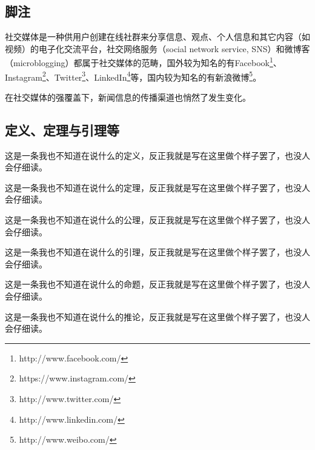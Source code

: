 \documentclass[a4paper,AutoFakeBold,oneside,12pt]{book}
\begin{document}
\subsection{脚注}
社交媒体是一种供用户创建在线社群来分享信息、观点、个人信息和其它内容（如视频）的电子化交流平台，社交网络服务（social network service, SNS）和微博客（microblogging）都属于社交媒体的范畴\cite{webster_social_media}，国外较为知名的有Facebook\footnote{http://www.facebook.com/}、Instagram\footnote{https://www.instagram.com/}、Twitter\footnote{http://www.twitter.com/}、LinkedIn\footnote{http://www.linkedin.com/}等，国内较为知名的有新浪微博\footnote{http://www.weibo.com/}。

在社交媒体的强覆盖下，新闻信息的传播渠道也悄然了发生变化。\cite{false_news_spread_2018}

\subsection{定义、定理与引理等}
\begin{definition}
这是一条我也不知道在说什么的定义，反正我就是写在这里做个样子罢了，也没人会仔细读。\cite{周兴2017基于深度学习的谣言检测及模式挖掘}
\end{definition}

\begin{theorem}
这是一条我也不知道在说什么的定理，反正我就是写在这里做个样子罢了，也没人会仔细读。
\end{theorem}

\begin{axiom}
这是一条我也不知道在说什么的公理，反正我就是写在这里做个样子罢了，也没人会仔细读。
\end{axiom}

\begin{lemma}
这是一条我也不知道在说什么的引理，反正我就是写在这里做个样子罢了，也没人会仔细读。
\end{lemma}

\begin{proposition}
这是一条我也不知道在说什么的命题，反正我就是写在这里做个样子罢了，也没人会仔细读。
\end{proposition}

\begin{corollary}
这是一条我也不知道在说什么的推论，反正我就是写在这里做个样子罢了，也没人会仔细读。
\end{corollary}
\end{document}
